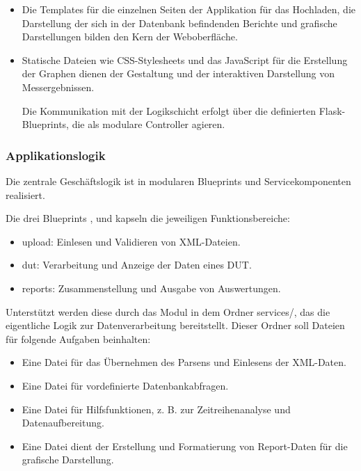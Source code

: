 \begin{itemize}

\item
Die Templates für die einzelnen Seiten der Applikation für das Hochladen, die Darstellung der sich in der Datenbank befindenden Berichte
und grafische Darstellungen bilden den Kern der Weboberfläche.

\item
Statische Dateien wie CSS-Stylesheets und das JavaScript für die Erstellung der Graphen dienen der Gestaltung und der
interaktiven Darstellung von Messergebnissen.

Die Kommunikation mit der Logikschicht erfolgt über die definierten Flask-Blueprints, die als modulare Controller agieren.

\end{itemize}

\subsubsection{Applikationslogik}

Die zentrale Geschäftslogik ist in modularen Blueprints und Servicekomponenten realisiert.

Die drei Blueprints ,  und  kapseln die jeweiligen Funktionsbereiche:

\begin{itemize}

\item
upload: Einlesen und Validieren von XML-Dateien.

\item
dut: Verarbeitung und Anzeige der Daten eines \ac{DUT}.

\item
reports: Zusammenstellung und Ausgabe von Auswertungen.

\end{itemize}

Unterstützt werden diese durch das Modul in dem Ordner services/, das die eigentliche Logik zur Datenverarbeitung bereitstellt.
Dieser Ordner soll Dateien für folgende Aufgaben beinhalten:

\begin{itemize}

\item
Eine Datei für das Übernehmen des Parsens und Einlesens der XML-Daten.

\item
Eine Datei für vordefinierte Datenbankabfragen.

\item
Eine Datei für Hilfsfunktionen, z. B. zur Zeitreihenanalyse und Datenaufbereitung.

\item
Eine Datei dient der Erstellung und Formatierung von Report-Daten für die grafische Darstellung.

\end{itemize}

